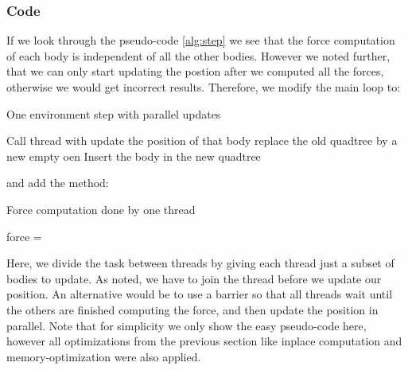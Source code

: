 \documentclass[a4paper]{scrartcl}
\begin{document}
        \subsubsection{Code}
            If we look through the pseudo-code \ref{alg:step} we see that the
            force computation of each body is independent of all the other
            bodies. However we noted further, that we can only start updating
            the postion after we computed all the forces, otherwise we would get
            incorrect results. Therefore, we modify the main loop to:
            \begin{algorithm}[H]
                \caption{One environment step with parallel updates}\label{alg:stepparallel}
                \begin{algorithmic}[1]
                    \State Call thread with 
                    \EndFor
                    \State {}
                    \EndFor
                    \State update the position of that body
                    \EndFor
                    \State replace the old quadtree by a new empty oen
                    \State Insert the body in the new quadtree
                    \EndFor
                    \EndProcedure
                \end{algorithmic}
            \end{algorithm}
            and add the method:
            \begin{algorithm}[H]
                \caption{Force computation done by one thread}
                \begin{algorithmic}[1]
                        \State force = 
                    \EndFor
                    \EndProcedure
                \end{algorithmic}
            \end{algorithm}
            Here, we divide the task between threads by giving each thread just
            a subset of bodies to update. As noted, we have to join the thread
            before we update our position. An alternative would be to use a
            barrier so that all threads wait until the others are finished
            computing the force, and then update the position in parallel. Note
            that for simplicity we only show the easy pseudo-code here, however
            all optimizations from the previous section like inplace computation
            and memory-optimization were also applied.
\end{document}
